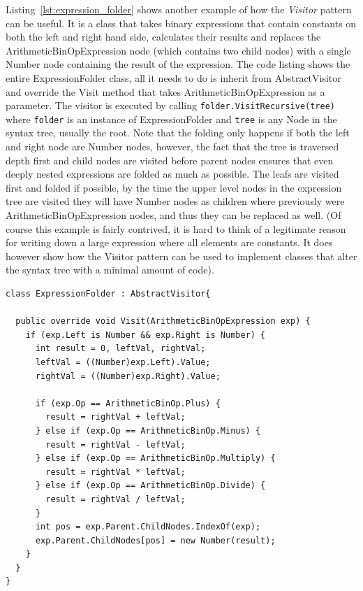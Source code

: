 	Listing~\ref{lst:expression_folder} shows another example of how the 
	\textit{Visitor} pattern can be useful. It is a class that takes binary 
	expressions that contain constants on both the left and right hand side, 
	calculates their results and replaces the \textsf{ArithmeticBinOpExpression} 
	node (which contains two child nodes) with a single \textsf{Number} node 
	containing the result of the expression. The code listing shows the entire 
	\textsf{ExpressionFolder} class, all it needs to do is inherit from 
	\textsf{AbstractVisitor} and override the \textsf{Visit} method that takes 
	\textsf{ArithmeticBinOpExpression} as a parameter. The visitor is executed 
	by calling \texttt{folder.VisitRecursive(tree)} where \texttt{folder} is an 
	instance of \textsf{ExpressionFolder} and \texttt{tree} is any \textsf{Node} 
	in the syntax tree, usually the root. Note that the folding 
	only happens if both the left and right node are \textsf{Number} nodes, 
	however, the fact that the tree is traversed depth first and child nodes are 
	visited before parent nodes ensures that even deeply nested expressions
	are folded as much as possible. The leafs are visited first and folded if 
	possible, by the time the upper level nodes in the expression tree are 
	visited they will have \textsf{Number} nodes as children where previously 
	were \textsf{ArithmeticBinOpExpression} nodes, and thus they can be replaced 
	as well. (Of course this example is fairly contrived, it is hard to think of
	a legitimate reason for writing down a large expression where all elements
	are constants. It does however show how the \textsf{Visitor} pattern can
	be used to implement classes that alter the syntax tree with a minimal 
	amount of code).
	
	\begin{lstlisting}[caption=Expression folder implemented using Visitor pattern, label=lst:expression_folder]
class ExpressionFolder : AbstractVisitor{

  public override void Visit(ArithmeticBinOpExpression exp) {
    if (exp.Left is Number && exp.Right is Number) {
      int result = 0, leftVal, rightVal;
      leftVal = ((Number)exp.Left).Value;
      rightVal = ((Number)exp.Right).Value;
		
      if (exp.Op == ArithmeticBinOp.Plus) {
        result = rightVal + leftVal;
      } else if (exp.Op == ArithmeticBinOp.Minus) {
        result = rightVal - leftVal;
      } else if (exp.Op == ArithmeticBinOp.Multiply) {
        result = rightVal * leftVal;
      } else if (exp.Op == ArithmeticBinOp.Divide) {
        result = rightVal / leftVal;
      }
      int pos = exp.Parent.ChildNodes.IndexOf(exp);
      exp.Parent.ChildNodes[pos] = new Number(result);
    }
  }
}
\end{lstlisting}

